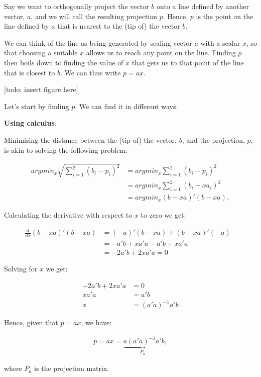 \documentclass[
  letterpaper,
  DIV=11,
  numbers=noendperiod]{scrartcl}
\begin{document}
Say we want to orthogonally project the vector \(b\) onto a line defined
by another vector, \(a\), and we will call the resulting projection
\(p\). Hence, \(p\) is the point on the line defined by \(a\) that is
nearest to the (tip of) the vector \(b\).

We can think of the line as being generated by scaling vector \(a\) with
a scalar \(x\), so that choosing a suitable \(x\) allows us to reach any
point on the line. Finding \(p\) then boils down to finding the value of
\(x\) that gets us to that point of the line that is closest to \(b\).
We can thus write \(p = ax\).

{[}todo: insert figure here{]}

Let's start by finding \(p\). We can find it in different ways.

\textbf{Using calculus}:

Minimising the distance between the (tip of) the vector, \(b\), and the
projection, \(p\), is akin to solving the following problem:

\[
\begin{aligned}
argmin_{x} \sqrt{\sum_{i=1}^2{(b_i - p_i)^2}} &= argmin_{x} \sum_{i=1}^2{(b_i - p_i)^2} \\
&= argmin_{x} \sum_{i=1}^2{(b_i - xa_i)^2} \\
&= argmin_{x} (b - xa)'(b - xa),
\end{aligned}
\]

Calculating the derivative with respect to \(x\) to zero we get:

\[
\begin{aligned}
\frac{d}{dx} (b - xa)'(b - xa) &= (-a)'(b - xa) + (b - xa)'(-a) & \\
&= -a'b + xa'a - a'b + xa'a \\
&= -2a'b + 2xa'a = 0
\end{aligned}
\]

Solving for \(x\) we get:

\[
\begin{aligned}
-2a'b + 2xa'a &= 0 \\
xa'a &= a'b \\
x &= (a'a)^{-1}a'b
\end{aligned}
\]

Hence, given that \(p = ax\), we have:

\[
\begin{aligned}
p = ax = \underbrace{a(a'a)^{-1}a'}_\text{$P_a$}b,
\end{aligned}
\]

where \(P_a\) is the projection matrix.
\end{document}
